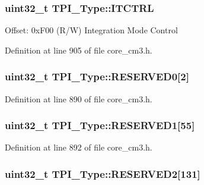 \subsubsection[{\texorpdfstring{I\+T\+C\+T\+RL}{ITCTRL}}]{ uint32\+\_\+t T\+P\+I\+\_\+\+Type\+::\+I\+T\+C\+T\+RL}\hypertarget{structTPI__Type_ab49c2cb6b5fe082746a444e07548c198}{}\label{structTPI__Type_ab49c2cb6b5fe082746a444e07548c198}
Offset\+: 0x\+F00 (R/W) Integration Mode Control 

Definition at line 905 of file core\+\_\+cm3.\+h.

\subsubsection[{\texorpdfstring{R\+E\+S\+E\+R\+V\+E\+D0}{RESERVED0}}]{\setlength{\rightskip}{0pt plus 5cm}uint32\+\_\+t T\+P\+I\+\_\+\+Type\+::\+R\+E\+S\+E\+R\+V\+E\+D0\mbox{[}2\mbox{]}}\hypertarget{structTPI__Type_af143c5e8fc9a3b2be2878e9c1f331aa9}{}\label{structTPI__Type_af143c5e8fc9a3b2be2878e9c1f331aa9}


Definition at line 890 of file core\+\_\+cm3.\+h.

\subsubsection[{\texorpdfstring{R\+E\+S\+E\+R\+V\+E\+D1}{RESERVED1}}]{\setlength{\rightskip}{0pt plus 5cm}uint32\+\_\+t T\+P\+I\+\_\+\+Type\+::\+R\+E\+S\+E\+R\+V\+E\+D1\mbox{[}55\mbox{]}}\hypertarget{structTPI__Type_ac3956fe93987b725d89d3be32738da12}{}\label{structTPI__Type_ac3956fe93987b725d89d3be32738da12}


Definition at line 892 of file core\+\_\+cm3.\+h.

\subsubsection[{\texorpdfstring{R\+E\+S\+E\+R\+V\+E\+D2}{RESERVED2}}]{\setlength{\rightskip}{0pt plus 5cm}uint32\+\_\+t T\+P\+I\+\_\+\+Type\+::\+R\+E\+S\+E\+R\+V\+E\+D2\mbox{[}131\mbox{]}}\hypertarget{structTPI__Type_ac7bbb92e6231b9b38ac483f7d161a096}{}\label{structTPI__Type_ac7bbb92e6231b9b38ac483f7d161a096}



